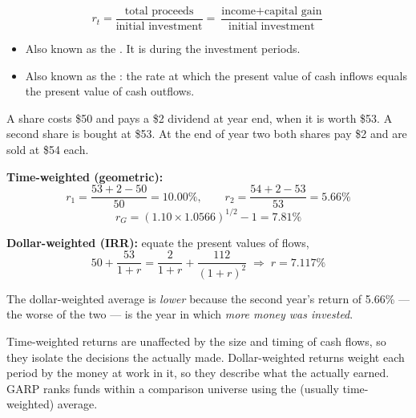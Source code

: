 
\begin{imfmlbox}
\[ r_t = \frac{\text{total proceeds}}{\text{initial investment}}
       = \frac{\text{income} + \text{capital gain}}{\text{initial investment}} \]
\end{imfmlbox}

\begin{itemize}
\item {} Also known as the . It
is  during the investment periods.
\item {} Also known as the : the rate at which the present value of cash inflows equals the
present value of cash outflows.
\end{itemize}

\gapbadge
{}

\begin{imexbox}[title={Why the two averages differ}]
A share costs \$50 and pays a \$2 dividend at year end, when it is worth \$53. A
second share is bought at \$53. At the end of year two both shares pay \$2 and are
sold at \$54 each.

\medskip
\textbf{Time-weighted (geometric):}
\[ r_1 = \frac{53 + 2 - 50}{50} = 10.00\%, \qquad
   r_2 = \frac{54 + 2 - 53}{53} = 5.66\% \]
\[ r_G = (1.10 \times 1.0566)^{1/2} - 1 = \mathbf{7.81\%} \]

\textbf{Dollar-weighted (IRR):} equate the present values of flows,
\[ 50 + \frac{53}{1+r} = \frac{2}{1+r} + \frac{112}{(1+r)^2}
   \;\Longrightarrow\; r = \mathbf{7.117\%} \]

\medskip
The dollar-weighted average is \emph{lower} because the second year's return of
5.66\% --- the worse of the two --- is the year in which \emph{more money was
invested}.
\end{imexbox}

\begin{imkeybox}[title={Which to use, and why}]
Time-weighted returns are unaffected by the size and timing of cash flows, so
they isolate the decisions the  actually made. Dollar-weighted
returns weight each period by the money at work in it, so they describe what the
 actually earned. GARP ranks funds within a comparison universe
using the (usually time-weighted) average.
\end{imkeybox}

